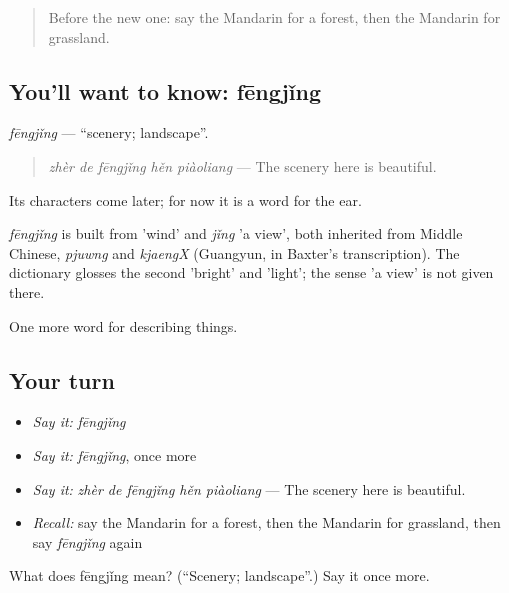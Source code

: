 \begin{quote}
Before the new one: say the Mandarin for a forest, then the Mandarin for grassland.
\end{quote}

\subsection*{You'll want to know: fēngjǐng}
\emph{fēngjǐng} — \textquotedblleft{}scenery; landscape\textquotedblright{}.

\begin{quote}
\emph{zhèr de fēngjǐng hěn piàoliang} — The scenery here is beautiful.
\end{quote}

Its characters come later; for now it is a word for the ear.

\begin{cousinweb}
\emph{fēngjǐng} is built from  'wind' and \emph{jǐng} 'a view', both inherited from Middle Chinese, \emph{pjuwng} and \emph{kjaengX} (Guangyun, in Baxter's transcription). The dictionary glosses the second 'bright' and 'light'; the sense 'a view' is not given there.
\end{cousinweb}

\begin{grammarlens}[title={What you've built}]
One more word for describing things.
\end{grammarlens}

\subsection*{Your turn}
\begin{itemize}
\raggedright
  \item \emph{Say it:} \emph{fēngjǐng}
  \item \emph{Say it:} \emph{fēngjǐng}, once more
  \item \emph{Say it:} \emph{zhèr de fēngjǐng hěn piàoliang} — The scenery here is beautiful.
  \item \emph{Recall:} say the Mandarin for a forest, then the Mandarin for grassland, then say \emph{fēngjǐng} again
\end{itemize}

\begin{tcolorbox}[breakable,colback=teal!4,colframe=teal!35!black,title={Before you move on}]
What does fēngjǐng mean? (\textquotedblleft{}Scenery; landscape\textquotedblright{}.) Say it once more.
\end{tcolorbox}
